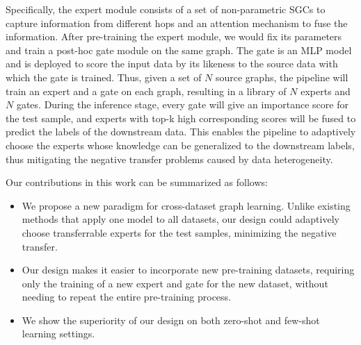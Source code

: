 
Specifically, the expert module consists of a set of non-parametric SGCs to capture information from different hops and an attention mechanism to fuse the information.
After pre-training the expert module, we would fix its parameters and train a post-hoc gate module on the same graph.
The gate is an MLP model and is deployed to score the input data by its likeness to the source data with which the gate is trained.
Thus, given a set of $N$ source graphs, the pipeline will train an expert and a gate on each graph, resulting in a library of $N$ experts and $N$ gates.
During the inference stage, every gate will give an importance score for the test sample, and experts with top-k high corresponding scores will be fused to predict the labels of the downstream data.
This enables the pipeline to adaptively choose the experts whose knowledge can be generalized to the downstream labels, thus mitigating the negative transfer problems caused by data heterogeneity.

Our contributions in this work can be summarized as follows:
\begin{itemize}[leftmargin=*]
\item We propose a new paradigm for cross-dataset graph learning. Unlike existing methods that apply one model to all datasets, our design could adaptively choose transferrable experts for the test samples, minimizing the negative transfer.
\item Our design makes it easier to incorporate new pre-training datasets, requiring only the training of a new expert and gate for the new dataset, without needing to repeat the entire pre-training process.
\item We show the superiority of our design on both zero-shot and few-shot learning settings.  
\end{itemize}